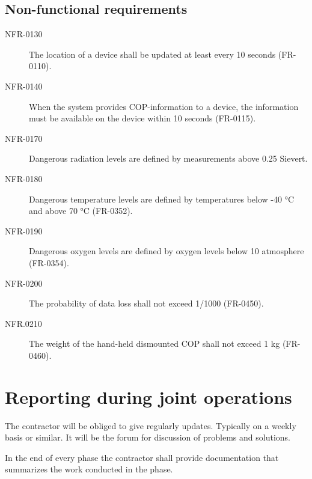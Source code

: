 \subsection{Non-functional requirements}
\begin{description}
\item[NFR-0130] The location of a device shall be updated at least every 10 seconds (FR-0110).
\item[NFR-0140] When the system provides COP-information to a device, the information must
be available on the device within 10 seconds (FR-0115).
\item[NFR-0170] Dangerous radiation levels are defined by measurements above 0.25 Sievert.
\item[NFR-0180] Dangerous temperature levels are defined by temperatures below -40 °C and
above 70 °C (FR-0352).
\item[NFR-0190] Dangerous oxygen levels are defined by oxygen levels below 10 %
atmosphere (FR-0354).
\item[NFR-0200] The probability of data loss shall not exceed 1/1000 (FR-0450).
\item[NFR.0210] The weight of the hand-held dismounted COP shall not exceed 1 kg (FR-0460).


\end{description}



\section{Reporting during joint operations}
The contractor will be obliged to give regularly updates. Typically on a weekly basis or similar. It will be the forum for discussion of problems and solutions. 

In the end of every phase the contractor shall provide documentation that summarizes the work conducted in the phase.